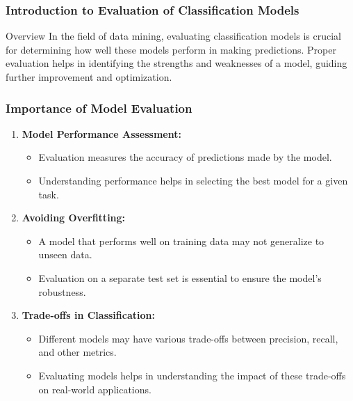 \documentclass[aspectratio=169]{beamer}
\begin{document}
\frame{\titlepage}

\begin{frame}[fragile]
    \frametitle{Introduction to Evaluation of Classification Models}
    \begin{block}{Overview}
        In the field of data mining, evaluating classification models is crucial for determining how well these models perform in making predictions. Proper evaluation helps in identifying the strengths and weaknesses of a model, guiding further improvement and optimization.
    \end{block}
\end{frame}

\begin{frame}[fragile]
    \frametitle{Importance of Model Evaluation}
    \begin{enumerate}
        \item \textbf{Model Performance Assessment:}
            \begin{itemize}
                \item Evaluation measures the accuracy of predictions made by the model.
                \item Understanding performance helps in selecting the best model for a given task.
            \end{itemize}
            
        \item \textbf{Avoiding Overfitting:}
            \begin{itemize}
                \item A model that performs well on training data may not generalize to unseen data.
                \item Evaluation on a separate test set is essential to ensure the model's robustness.
            \end{itemize}
            
        \item \textbf{Trade-offs in Classification:}
            \begin{itemize}
                \item Different models may have various trade-offs between precision, recall, and other metrics.
                \item Evaluating models helps in understanding the impact of these trade-offs on real-world applications.
            \end{itemize}
    \end{enumerate}
\end{frame}
\end{document}
